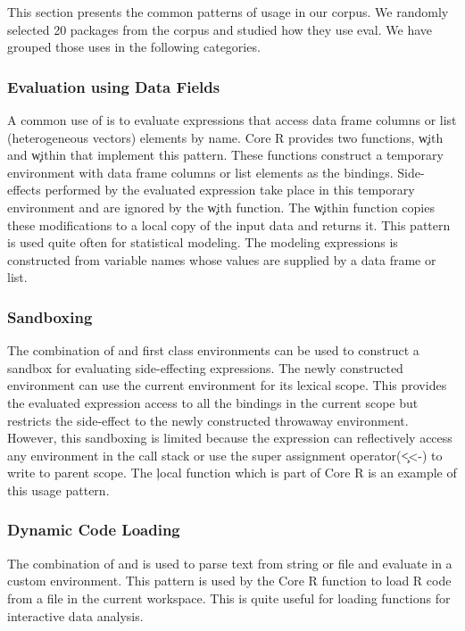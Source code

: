 \documentclass[conference]{IEEEtran}
\begin{document}
This section presents the common patterns of \eval usage in our corpus. We
randomly selected 20 packages from the corpus and studied how they use eval.
We have grouped those uses in the following categories.

  \subsubsection{Evaluation using Data Fields} A common use of \eval is to
  evaluate expressions that access data frame columns or list (heterogeneous
  vectors) elements by name. Core R provides two functions, \c{with} and
  \c{within} that implement this pattern. These functions construct a temporary
  environment with data frame columns or list elements as the bindings.
  Side-effects performed by the evaluated expression take place in this temporary
  environment and are ignored by the \c{with} function. The \c{within} function
  copies these modifications to a local copy of the input data and returns it.
  This pattern is used quite often for statistical modeling. The modeling
  expressions is constructed from variable names whose values are supplied by a
  data frame or list.

  \subsubsection{Sandboxing} The combination of \eval and first class
  environments can be used to construct a sandbox for evaluating side-effecting
  expressions. The newly constructed environment can use the current environment
  for its lexical scope. This provides the evaluated expression access to all the
  bindings in the current scope but restricts the side-effect to the newly
  constructed throwaway environment. However, this sandboxing is limited because
  the expression can reflectively access any environment in the call stack or use
  the super assignment operator(\c{<<-}) to write to parent scope. The \c{local}
  function which is part of Core R is an example of this usage pattern.

  \subsubsection{Dynamic Code Loading} The combination of \parse and \eval is
  used to parse text from string or file and evaluate in a custom environment.
  This pattern is used by the \source Core R function to load R code from a file
  in the current workspace. This is quite useful for loading functions for
  interactive data analysis.
\end{document}
